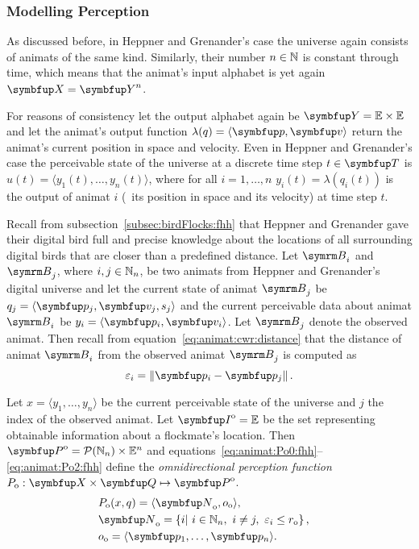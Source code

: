 \subsubsection{Modelling Perception}
As discussed before, in Heppner and Grenander's case the universe again consists of animats of the same kind. Similarly, their number $n \in \mathbb{N}$ is constant through time, which means that the animat's input alphabet is yet again $\set{X}=\set{Y}^n$.

For reasons of consistency let the output alphabet again be $\set{Y}=\E \times \E$ and let the animat's output function $\lambda(q)=\langle\vect{p},\vect{v}\rangle$ return the animat's current position in space and velocity. Even in Heppner and Grenander's case the perceivable state of the universe at a discrete time step $t \in \set{T}$ is $u(t)=\langle y_1(t),\ldots,y_n(t)\rangle$, where for all $i=1,\ldots,n$ $y_i(t)=\lambda(q_i(t))$ is the output of animat $i$ (\ie\ its position in space and its velocity) at time step $t$.

Recall from subsection~\ref{subsec:birdFlocks:fhh} that Heppner and Grenander gave their digital bird full and precise knowledge about the locations of all surrounding digital birds that are closer than a predefined distance. Let $\autom{B}_i$ and $\autom{B}_j$, where $i, j \in \mathbb{N}_n$, be two animats from Heppner and Grenander's digital universe and let the current state of animat $\autom{B}_j$ be $q_j=\langle \vect{p}_j,\vect{v}_j,s_j \rangle$ and the current perceivable data about animat $\autom{B}_i$ be $y_i=\langle \vect{p}_i, \vect{v}_i \rangle$. Let $\autom{B}_j$ denote the observed animat. Then recall from equation~\eqref{eq:animat:cwr:distance} that the distance of animat $\autom{B}_i$ from the observed animat $\autom{B}_j$ is computed as
%
\begin{equation}
  \varepsilon_i=\left\|\vect{p}_i - \vect{p}_j\right\|. \nonumber
\end{equation}

\begin{definition}
  \label{def:animat:Po:fhh}
  Let $x=\langle y_1,\ldots,y_n\rangle$ be the current perceivable state of the universe and $j$ the index of the observed animat. Let $\set{I}^\textnormal{o}=\E$ be the set representing obtainable information about a flockmate's location. Then $\set{P}^\textnormal{o}=\powset{\N_n} \times \E^n$ and equations~\eqref{eq:animat:Po0:fhh}--\eqref{eq:animat:Po2:fhh} define the \emph{omnidirectional perception function} $P_\textnormal{o}: \set{X} \times \set{Q} \mapsto \set{P}^\textnormal{o}$.
  \begin{eqnarray}
    & P_\textnormal{o}(x,q)=\langle\set{N}_\textnormal{o},o_\textnormal{o}\rangle, & \label{eq:animat:Po0:fhh} \\
    & \set{N}_\textnormal{o}=\left\{i|\ i \in \N_n,\ i \neq j,\ \varepsilon_i \leq r_\textnormal{o} \right\}, & \\
    & o_\textnormal{o}=\langle \vect{p}_1,\ldots,\vect{p}_n\rangle. & \label{eq:animat:Po2:fhh}
  \end{eqnarray}
\end{definition}

